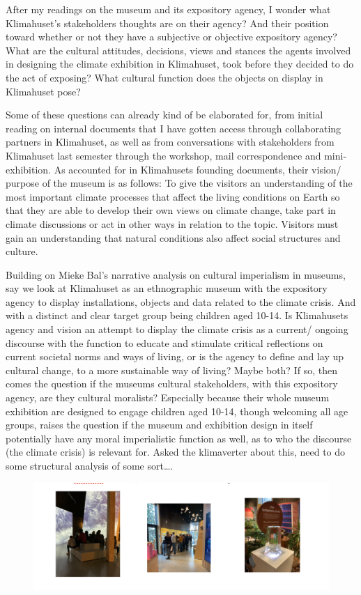After my readings on the museum and its expository agency, I wonder what Klimahuset’s stakeholders thoughts are on their agency? And their position toward whether or not they have a subjective or objective expository agency? What are the cultural attitudes, decisions, views and stances the agents involved in designing the climate exhibition in Klimahuset, took before they decided to do the act of exposing? What cultural function does the objects on display in Klimahuset pose? 

Some of these questions can already kind of be elaborated for, from initial reading on internal documents that I have gotten access through collaborating partners in Klimahuset, as well as from conversations with stakeholders from Klimahuset last semester through the workshop, mail correspondence and mini-exhibition. As accounted for in Klimahusets founding documents, their vision/ purpose of the museum is as follows:
To give the visitors an understanding of the most important climate processes that affect the living conditions on Earth so that they are able to develop their own views on climate change, take part in climate discussions or act in other ways in relation to the topic.
Visitors must gain an understanding that natural conditions also affect social structures and culture.
	
Building on Mieke Bal’s narrative analysis on cultural imperialism in museums, say we look at Klimahuset as an ethnographic museum with the expository agency to display installations, objects and data related to the climate crisis. And with a distinct and clear target group being children aged 10-14. Is Klimahusets agency and vision an attempt to display the climate crisis as a current/ ongoing discourse with the function to educate and stimulate critical reflections on current societal norms and ways of living, or is the agency to define and lay up cultural change, to a more sustainable way of living? Maybe both? If so, then comes the question if the museums cultural stakeholders, with this expository agency, are they cultural moralists? Especially because their whole museum exhibition are designed to engage children aged 10-14, though welcoming all age groups, raises the question if the museum and exhibition design in itself potentially have any moral imperialistic function as well, as to who the discourse (the climate crisis) is relevant for. 
Asked the klimaverter about  this, need to do some structural analysis of some sort….

\begin{figure}[H]
\includegraphics[width=13cm]{pictures/elever_i_klimahuset.png}
\centering 
\end{figure}

